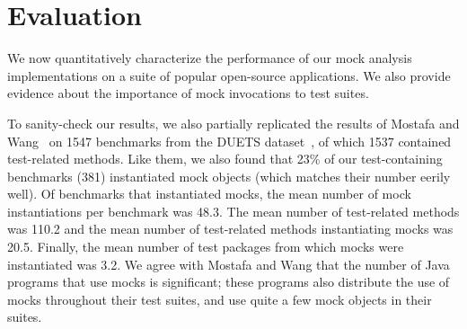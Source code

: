\section{Evaluation}
\label{sec:evaluation}

We now quantitatively characterize the performance of our mock analysis implementations on a suite of popular open-source applications. We also provide evidence about the importance of mock invocations to test suites.

To sanity-check our results, we also partially replicated the results of Mostafa and Wang~\cite{mostafa14:_empir_study_usage_mockin_framew_softw_testin} on 1547 benchmarks from the DUETS dataset~\cite{durieux2021duets}, of which 1537 contained test-related methods. Like them, we also found that 23\% of our test-containing benchmarks (381) instantiated mock objects (which matches their number eerily well). Of benchmarks that instantiated mocks, the mean number of mock instantiations per benchmark was 48.3. The mean number of test-related methods was 110.2 and the mean number of test-related methods instantiating mocks was 20.5. Finally, the mean number of test packages from which mocks were instantiated was 3.2. We agree with Mostafa and Wang that the number of Java programs that use mocks is significant; these programs also distribute the use of mocks throughout their test suites, and use quite a few mock objects in their suites.

